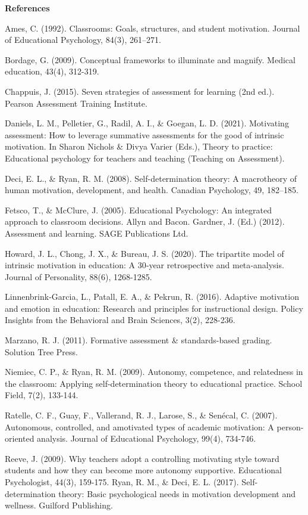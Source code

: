 \documentclass[
]{book}
\begin{document}
\textbf{References}

Ames, C. (1992). Classrooms: Goals, structures, and student motivation. Journal of Educational Psychology, 84(3), 261--271.

Bordage, G. (2009). Conceptual frameworks to illuminate and magnify. Medical education, 43(4), 312-319.

Chappuis, J. (2015). Seven strategies of assessment for learning (2nd ed.). Pearson Assessment Training Institute.

Daniels, L. M., Pelletier, G., Radil, A. I., \& Goegan, L. D. (2021). Motivating assessment: How to leverage summative assessments for the good of intrinsic motivation. In Sharon Nichols \& Divya Varier (Eds.), Theory to practice: Educational psychology for teachers and teaching (Teaching on Assessment).

Deci, E. L., \& Ryan, R. M. (2008). Self-determination theory: A macrotheory of human motivation, development, and health. Canadian Psychology, 49, 182--185.

Fetsco, T., \& McClure, J. (2005). Educational Psychology: An integrated approach to classroom decisions. Allyn and Bacon.
Gardner, J. (Ed.) (2012). Assessment and learning. SAGE Publications Ltd.

Howard, J. L., Chong, J. X., \& Bureau, J. S. (2020). The tripartite model of intrinsic motivation in education: A 30‐year retrospective and meta‐analysis. Journal of Personality, 88(6), 1268-1285.

Linnenbrink-Garcia, L., Patall, E. A., \& Pekrun, R. (2016). Adaptive motivation and emotion in education: Research and principles for instructional design. Policy Insights from the Behavioral and Brain Sciences, 3(2), 228-236.

Marzano, R. J. (2011). Formative assessment \& standards-based grading. Solution Tree Press.

Niemiec, C. P., \& Ryan, R. M. (2009). Autonomy, competence, and relatedness in the classroom: Applying self-determination theory to educational practice. School Field, 7(2), 133-144.

Ratelle, C. F., Guay, F., Vallerand, R. J., Larose, S., \& Senécal, C. (2007). Autonomous, controlled, and amotivated types of academic motivation: A person-oriented analysis. Journal of Educational Psychology, 99(4), 734-746.

Reeve, J. (2009). Why teachers adopt a controlling motivating style toward students and how they can become more autonomy supportive. Educational Psychologist, 44(3), 159-175. Ryan, R. M., \& Deci, E. L. (2017). Self-determination theory: Basic psychological needs in motivation development and wellness. Guilford Publishing.
\end{document}
